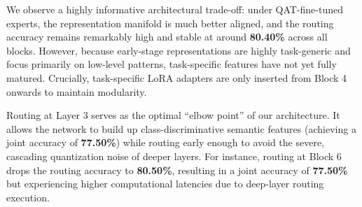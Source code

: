 \documentclass{article}
\theoremstyle{plain}
\theoremstyle{definition}
\theoremstyle{remark}
\begin{document}
We observe a highly informative architectural trade-off: under QAT-fine-tuned experts, the representation manifold is much better aligned, and the routing accuracy remains remarkably high and stable at around \textbf{80.40\%} across all blocks. However, because early-stage representations are highly task-generic and focus primarily on low-level patterns, task-specific features have not yet fully matured. Crucially, task-specific LoRA adapters are only inserted from Block 4 onwards to maintain modularity.

Routing at Layer 3 serves as the optimal ``elbow point'' of our architecture. It allows the network to build up class-discriminative semantic features (achieving a joint accuracy of \textbf{77.50\%}) while routing early enough to avoid the severe, cascading quantization noise of deeper layers. For instance, routing at Block 6 drops the routing accuracy to \textbf{80.50\%}, resulting in a joint accuracy of \textbf{77.50\%} but experiencing higher computational latencies due to deep-layer routing execution.
\end{document}
